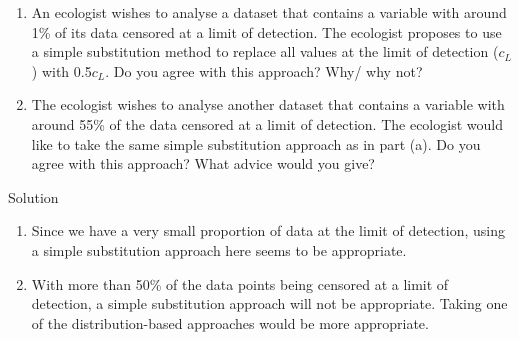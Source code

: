 \documentclass[
  letterpaper,
  DIV=11,
  numbers=noendperiod,
  oneside]{scrartcl}
\begin{document}
\begin{tcolorbox}[enhanced jigsaw, bottomrule=.15mm, breakable, bottomtitle=1mm, colback=white, titlerule=0mm, colbacktitle=quarto-callout-tip-color!10!white, rightrule=.15mm, toptitle=1mm, left=2mm, opacityback=0, toprule=.15mm, arc=.35mm, title={Task 5}, colframe=quarto-callout-tip-color-frame, coltitle=black, leftrule=.75mm, opacitybacktitle=0.6]

\begin{enumerate}
\def\labelenumi{(\alph{enumi})}
\item
  An ecologist wishes to analyse a dataset that contains a variable with
  around 1\% of its data censored at a limit of detection. The ecologist
  proposes to use a simple substitution method to replace all values at
  the limit of detection (\(c_L\)) with 0.5\(c_L\). Do you agree with
  this approach? Why/ why not?
\item
  The ecologist wishes to analyse another dataset that contains a
  variable with around 55\% of the data censored at a limit of
  detection. The ecologist would like to take the same simple
  substitution approach as in part (a). Do you agree with this approach?
  What advice would you give?
\end{enumerate}

Solution

\begin{enumerate}
\def\labelenumi{(\alph{enumi})}
\item
  Since we have a very small proportion of data at the limit of
  detection, using a simple substitution approach here seems to be
  appropriate.
\item
  With more than 50\% of the data points being censored at a limit of
  detection, a simple substitution approach will not be appropriate.
  Taking one of the distribution-based approaches would be more
  appropriate.
\end{enumerate}

\end{tcolorbox}
\end{document}
